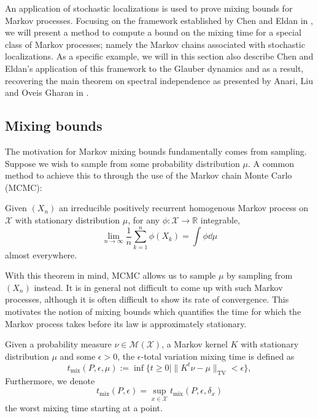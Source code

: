An application of stochastic localizations is used to prove mixing bounds for Markov processes. 
Focusing on the framework established by Chen and Eldan in \cite{Chen_2022}, we will present a method to 
compute a bound on the mixing time for a special class of Markov processes; namely the Markov chains 
associated with stochastic localizations. 
As a specific example, we will in this section also describe Chen and Eldan's \cite{Chen_2022} application 
of this framework to the Glauber dynamics and as a result, recovering the main theorem on spectral independence as 
presented by Anari, Liu and Oveis Gharan in \cite{Anari_2020}.

\subsection{Mixing bounds}

The motivation for Markov mixing bounds fundamentally comes from sampling. Suppose we wish to sample 
from some probability distribution $\mu$. A common method to achieve this to through the use of the 
Markov chain Monte Carlo (MCMC):
\begin{theorem}\label{thm:markov_conv}
  Given \((X_n)\) an irreducible positively recurrent homogenous Markov process on \(\mathcal{X}\) with
  stationary distribution \(\mu\), for any \(\phi : \mathcal{X} \to \mathbb{R}\) integrable, 
  \[\lim_{n \to \infty} \frac{1}{n} \sum_{k = 1}^n \phi(X_k) = \int \phi \dd \mu\]
  almost everywhere.  
\end{theorem}
With this theorem in mind, MCMC allows us to sample \(\mu\) by sampling from \((X_n)\) instead. It is in general 
not difficult to come up with such Markov processes, although it is often difficult to show its rate of convergence. 
This motivates the notion of mixing bounds which quantifies the time for which the Markov process takes before 
its law is approximately stationary.

\begin{definition}
  Given a probability measure \(\nu \in \mathcal{M}(\mathcal{X})\), a Markov kernel \(K\) with stationary 
  distribution \(\mu\) and some \(\epsilon > 0\), the \(\epsilon\)-total variation mixing time is defined as 
  \[t_{\text{mix}}(P, \epsilon, \mu) := \inf \{t \ge 0 \mid \|K^t\nu - \mu\|_{\text{TV}} < \epsilon\},\]
  Furthermore, we denote 
  \[t_{\text{mix}}(P, \epsilon) = \sup_{x \in \mathcal{X}} t_{\text{mix}}(P, \epsilon, \delta_x)\]
  the worst mixing time starting at a point.
\end{definition}

